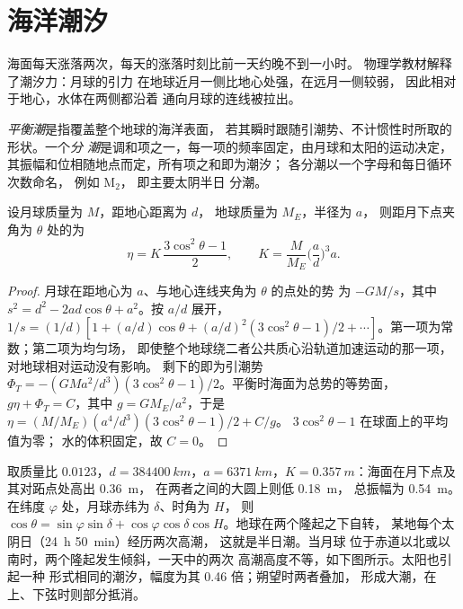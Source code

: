 \section{海洋潮汐}\label{sec:b3:ocean-dynamics:tides}

海面每天涨落两次，每天的涨落时刻比前一天约晚不到一小时。
物理学教材解释了潮汐力：月球的引力
在地球近月一侧比地心处强，在远月一侧较弱，
因此相对于地心，水体在两侧都沿着
通向月球的连线被拉出。

\begin{definition}[平衡潮；分潮]\label{def:b3:ocean-dynamics:tides}
\emph{平衡潮}是指覆盖整个地球的海洋表面，
若其瞬时跟随引潮势、不计惯性时所取的形状。一个\emph{分
潮}是调和项之一，每一项的频率固定，由月球和太阳的运动决定，
其振幅和位相随地点而定，所有项之和即为潮汐；
各分潮以一个字母和每日循环次数命名，
例如 M$_2$，
即主要太阴半日
分潮。
\end{definition}

\begin{theorem}[月球的平衡潮]\label{thm:b3:ocean-dynamics:equilibrium-tide}
设月球质量为 $M$，距地心距离为 $d$，
地球质量为 $M_E$，半径为 $a$，
则距月下点夹角为 $\theta$ 处的为
\[
\eta = K\,\frac{3\cos^2\theta - 1}{2},\qquad
K = \frac{M}{M_E}\Big(\frac{a}{d}\Big)^3 a .
\]
\end{theorem}

\begin{proof}
月球在距地心为 $a$、与地心连线夹角为 $\theta$ 的点处的势
为 $-GM/s$，其中 $s^2 = d^2 - 2ad\cos\theta +
a^2$。按 $a/d$ 展开，$1/s = (1/d)[1 + (a/d)\cos\theta + (a/d)^2
(3\cos^2\theta - 1)/2 + \cdots]$。第一项为常数；第二项为均匀场，
即使整个地球绕二者公共质心沿轨道加速运动的那一项，
对地球相对运动没有影响。
剩下的即为引潮势 $\Phi_T = -(GMa^2/d^3)(3
\cos^2\theta - 1)/2$。平衡时海面为总势的等势面，
$g\eta + \Phi_T = C$，其中 $g = GM_E/a^2$，于是
$\eta = (M/M_E)(a^4/d^3)(3\cos^2\theta - 1)/2 + C/g$。
$3\cos^2\theta - 1$ 在球面上的平均值为零；
水的体积固定，故 $C = 0$。
\end{proof}

取质量比 $0.0123$，$d = \qty{384400}{km}$，$a =
\qty{6371}{km}$，$K = \qty{0.357}{m}$：海面在月下点及其对跖点处高出 \qty{0.36}{m}，
在两者之间的大圆上则低 \qty{0.18}{m}，
总振幅为 \qty{0.54}{m}。在纬度 $\varphi$ 处，月球赤纬为 $\delta$、时角为 $H$，
则 $\cos\theta =
\sin\varphi\sin\delta + \cos\varphi\cos\delta\cos H$。地球在两个隆起之下自转，
某地每个太阴日（\qty{24}{h} \qty{50}{min}）经历两次高潮，
这就是半日潮。当月球
位于赤道以北或以南时，两个隆起发生倾斜，一天中的两次
高潮高度不等，如下图所示。太阳也引起一种
形式相同的潮汐，幅度为其 \num{0.46} 倍；朔望时两者叠加，
形成大潮，在上、下弦时则部分抵消。

